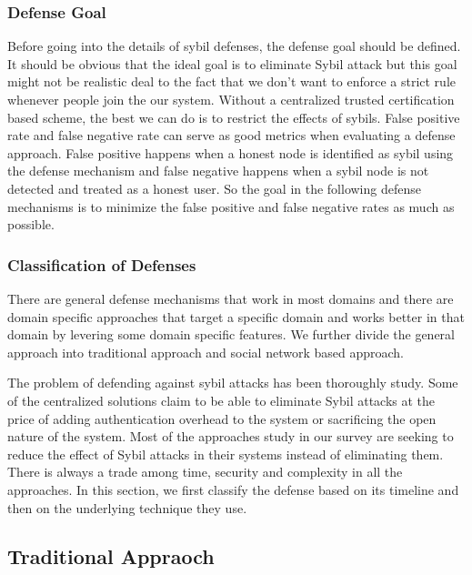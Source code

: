 \documentclass[conference]{IEEEtran}
\begin{document}
\subsubsection{Defense Goal}
Before going into the details of sybil defenses, the defense goal should be defined. It should be obvious that the ideal goal is to eliminate Sybil attack
but this goal might not be realistic deal to the fact that we don't want to enforce a strict rule whenever people join the our system.
Without a centralized trusted certification based scheme, the best we can do is to restrict the effects of sybils. False positive rate and false negative rate 
can serve as good metrics when evaluating a defense approach. False positive happens when a honest node is identified as sybil using the defense mechanism and
false negative happens when a sybil node is not detected and treated as a honest user. So the goal in the following defense mechanisms is to minimize the false 
positive and false negative rates as much as possible.

\subsubsection{Classification of Defenses}
There are general defense mechanisms that work in most domains and there are domain specific approaches that target a specific domain and works better in that domain by levering some 
domain specific features. We further divide the general approach into traditional approach and social network based approach. 

The problem of defending against sybil attacks has been thoroughly study. 
Some of the centralized solutions claim to be able to eliminate Sybil attacks at the price of adding authentication overhead to the system or sacrificing the 
open nature of the system. Most of the approaches study in our survey are seeking to reduce the effect of Sybil attacks in their systems instead of eliminating them.
There is always a trade among time, security and complexity in all the approaches. 
In this section, we first classify the defense based on its timeline and then on the underlying technique they use. 


\subsection{Traditional Appraoch}
\end{document}
